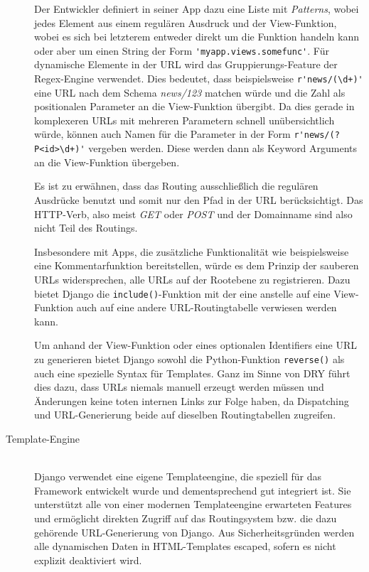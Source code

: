 \begin{description}
Der Entwickler definiert in seiner App dazu eine Liste mit \emph{Patterns}, wobei jedes Element aus
einem regulären Ausdruck und der View-Funktion, wobei es sich bei letzterem entweder direkt um die
Funktion handeln kann oder aber um einen String der Form \lstinline{'myapp.views.somefunc'}. Für
dynamische Elemente in der URL wird das Gruppierungs-Feature der Regex-Engine verwendet. Dies
bedeutet, dass beispielsweise \lstinline{r'news/(\d+)'} eine URL nach dem Schema \emph{news/123}
matchen würde und die Zahl als positionalen Parameter an die View-Funktion übergibt. Da dies gerade
in komplexeren URLs mit mehreren Parametern schnell unübersichtlich würde, können auch Namen für die
Parameter in der Form \lstinline{r'news/(?P<id>\d+)'} vergeben werden. Diese werden dann als Keyword
Arguments an die View-Funktion übergeben.

Es ist zu erwähnen, dass das Routing ausschließlich die regulären Ausdrücke benutzt und somit nur
den Pfad in der URL berücksichtigt. Das HTTP-Verb, also meist \emph{GET} oder \emph{POST} und der
Domainname sind also nicht Teil des Routings.

Insbesondere mit Apps, die zusätzliche Funktionalität wie beispielsweise eine Kommentarfunktion
bereitstellen, würde es dem Prinzip der sauberen URLs widersprechen, alle URLs auf der Rootebene zu
registrieren. Dazu bietet Django die \lstinline{include()}-Funktion mit der eine anstelle auf eine
View-Funktion auch auf eine andere URL-Routingtabelle verwiesen werden kann.

Um anhand der View-Funktion oder eines optionalen Identifiers eine URL zu generieren bietet Django
sowohl die Python-Funktion \lstinline{reverse()} als auch eine spezielle Syntax für Templates. Ganz
im Sinne von DRY führt dies dazu, dass URLs niemals manuell erzeugt werden müssen und Änderungen
keine toten internen Links zur Folge haben, da Dispatching und URL-Generierung beide auf dieselben
Routingtabellen zugreifen.


\item[Template-Engine] \hfill \\
Django verwendet eine eigene Templateengine, die speziell für das Framework entwickelt wurde und
dementsprechend gut integriert ist. Sie unterstützt alle von einer modernen Templateengine
erwarteten Features und ermöglicht direkten Zugriff auf das Routingsystem bzw. die dazu gehörende
URL-Generierung von Django. Aus Sicherheitsgründen werden alle dynamischen Daten in HTML-Templates
escaped, sofern es nicht explizit deaktiviert wird.


\end{description}
